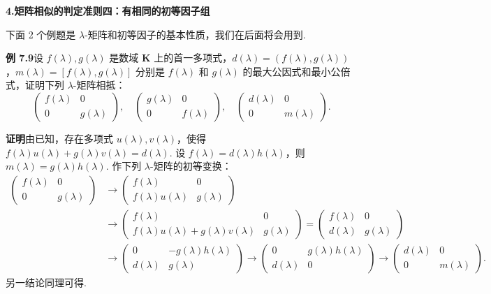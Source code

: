 \documentclass[UTF8,12pt,a4paper,fontset=fandol]{ctexart}
\begin{document}
\noindent\textbf{4.\quad 矩阵相似的判定准则四：有相同的初等因子组}

下面 2 个例题是 $\lambda$-矩阵和初等因子的基本性质，我们在后面将会用到.

\noindent\textbf{例 7.9}\quad 设 $f(\lambda),g(\lambda)$ 是数域 $\mathbf{K}$ 上的首一多项式，$d(\lambda)=(f(\lambda),g(\lambda))$，$m(\lambda)=[f(\lambda),g(\lambda)]$ 分别是 $f(\lambda)$ 和 $g(\lambda)$ 的最大公因式和最小公倍式，证明下列 $\lambda$-矩阵相抵：
\[
\left(\begin{array}{cc}
f(\lambda) & 0\\
0 & g(\lambda)
\end{array}\right),\quad
\left(\begin{array}{cc}
g(\lambda) & 0\\
0 & f(\lambda)
\end{array}\right),\quad
\left(\begin{array}{cc}
d(\lambda) & 0\\
0 & m(\lambda)
\end{array}\right).
\]

\noindent\textbf{证明}\quad 由已知，存在多项式 $u(\lambda),v(\lambda)$，使得 $f(\lambda)u(\lambda)+g(\lambda)v(\lambda)=d(\lambda)$. 设 $f(\lambda)=d(\lambda)h(\lambda)$，则 $m(\lambda)=g(\lambda)h(\lambda)$. 作下列 $\lambda$-矩阵的初等变换：
\[
\begin{array}{rl}
\left(\begin{array}{cc}
f(\lambda) & 0\\
0 & g(\lambda)
\end{array}\right)
&\to
\left(\begin{array}{cc}
f(\lambda) & 0\\
f(\lambda)u(\lambda) & g(\lambda)
\end{array}\right)\\[1.2em]
&\to
\left(\begin{array}{cc}
f(\lambda) & 0\\
f(\lambda)u(\lambda)+g(\lambda)v(\lambda) & g(\lambda)
\end{array}\right)
=
\left(\begin{array}{cc}
f(\lambda) & 0\\
d(\lambda) & g(\lambda)
\end{array}\right)\\[1.2em]
&\to
\left(\begin{array}{cc}
0 & -g(\lambda)h(\lambda)\\
d(\lambda) & g(\lambda)
\end{array}\right)
\to
\left(\begin{array}{cc}
0 & g(\lambda)h(\lambda)\\
d(\lambda) & 0
\end{array}\right)
\to
\left(\begin{array}{cc}
d(\lambda) & 0\\
0 & m(\lambda)
\end{array}\right).
\end{array}
\]
另一结论同理可得.
\end{document}
